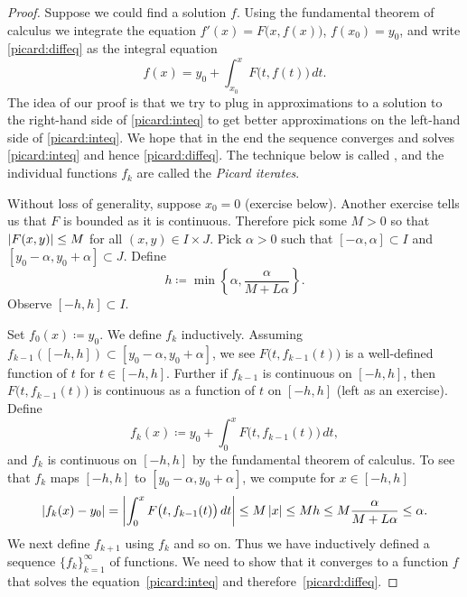 \begin{proof}
\pagebreak[2]
Suppose we could find a solution $f$.  Using the fundamental
theorem of calculus we integrate the equation 
$f'(x) = F\bigl(x,f(x)\bigr)$, $f(x_0) = y_0$, and write \eqref{picard:diffeq}
as the integral equation
\begin{equation} \label{picard:inteq}
f(x) = y_0 + \int_{x_0}^x F\bigl(t,f(t)\bigr)\,dt .
\end{equation}
The idea of our proof is that we try to plug in approximations to
a solution to the right-hand side of \eqref{picard:inteq} to get better approximations on the
left-hand side of  \eqref{picard:inteq}.  We hope that in the end the sequence 
converges and solves
\eqref{picard:inteq} and hence \eqref{picard:diffeq}.
The technique below is called \emph{},
and the individual functions $f_k$ are called the 
\emph{Picard iterates}.

Without loss of generality, suppose $x_0 = 0$ (exercise below).
Another
exercise tells us that $F$ is bounded as it is continuous.
Therefore pick some $M > 0$ so that 
$\left\lvert {F(x,y)} \right\rvert \leq M$ for all $(x,y) \in I\times J$.
Pick $\alpha > 0$ such that
$[-\alpha,\alpha] \subset I$ and $[y_0-\alpha, y_0 + \alpha] \subset J$.
Define
\begin{equation*}
h \coloneqq \min \left\{ \alpha, \frac{\alpha}{M+L\alpha} \right\} .
\end{equation*}
Observe
$[-h,h] \subset I$.

Set $f_0(x) \coloneqq y_0$.
We define $f_k$ inductively.
Assuming $f_{k-1}([-h,h]) \subset [y_0-\alpha,y_0+\alpha]$,
we see 
$F\bigl(t,f_{k-1}(t)\bigr)$ is
a well-defined function of $t$ for $t \in [-h,h]$.
Further if $f_{k-1}$ is continuous
on $[-h,h]$, then
$F\bigl(t,f_{k-1}(t)\bigr)$ is
continuous as
a function of $t$ on $[-h,h]$ (left as an exercise).
Define
\begin{equation*}
f_k(x) \coloneqq y_0+ \int_{0}^x F\bigl(t,f_{k-1}(t)\bigr)\,dt ,
\end{equation*}
and $f_k$ is continuous on $[-h,h]$ by the fundamental theorem of calculus.
To see that $f_k$ maps $[-h,h]$ to $[y_0-\alpha,y_0+\alpha]$, we compute for
$x \in [-h,h]$
\begin{equation*}
\left\lvert {f_k(x) - y_0} \right\rvert = 
\left\lvert {\int_{0}^x F\bigl(t,f_{k-1}(t)\bigr)\,dt } \right\rvert
\leq
M\left\lvert {x} \right\rvert
\leq
Mh
\leq
M
\frac{\alpha}{M+L\alpha}
\leq \alpha .
\end{equation*}
We next define $f_{k+1}$ using $f_k$ and so on.
Thus we have inductively defined a sequence $\{ f_k \}_{k=1}^\infty$ of functions.
We need to show that it converges to a function $f$ that solves
the equation~\eqref{picard:inteq} and therefore~\eqref{picard:diffeq}.


\end{proof}
